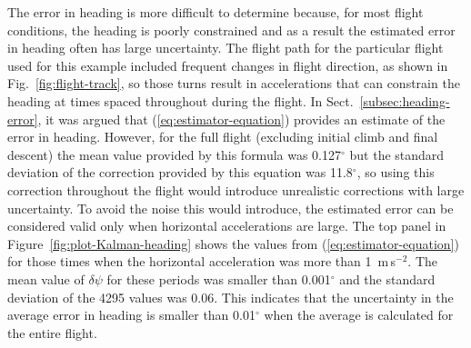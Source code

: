 \documentclass[12pt,twoside,english,12pt,twoside,english]{article}\usepackage[]{graphicx}\usepackage[]{color}
\let\OrgIndex\index
\renewcommand*{\index}[1]{\OrgIndex{#1}}
\begin{document}
The
error in heading is more difficult to determine because, for most
flight conditions, the heading is poorly constrained and as a result
the estimated error in heading often has large uncertainty. 
The flight path for the particular flight used for this example included
frequent changes in flight direction, as shown in Fig.~\ref{fig:flight-track},
so those turns result in accelerations that can constrain the heading
at times spaced throughout during the flight. In Sect.~\ref{subsec:heading-error},
it was argued that (\ref{eq:estimator-equation}) provides an estimate
of the error in heading. However, for the full
flight (excluding initial climb and final descent) the mean value
provided by this formula was 0.127$^{\circ}$
but the standard deviation of the correction provided by this equation
was 11.8$^{\circ}$,
so using this correction throughout the flight would introduce unrealistic
corrections with large uncertainty. To avoid the noise
this would introduce, the estimated error can be considered valid
only when horizontal accelerations are large. The top panel in Figure~\ref{fig:plot-Kalman-heading}
shows the values from (\ref{eq:estimator-equation}) for those times
when the horizontal acceleration was more than 1~m\,s$^{-2}$. The
mean value of $\delta\psi$ for these periods was smaller than 0.001$^{\circ}$
and the standard deviation of the 4295 values was 0.06.
This indicates that the uncertainty
in the average error in heading
is smaller than 0.01$^{\circ}$ when the average is calculated for
the entire flight. 
\end{document}
